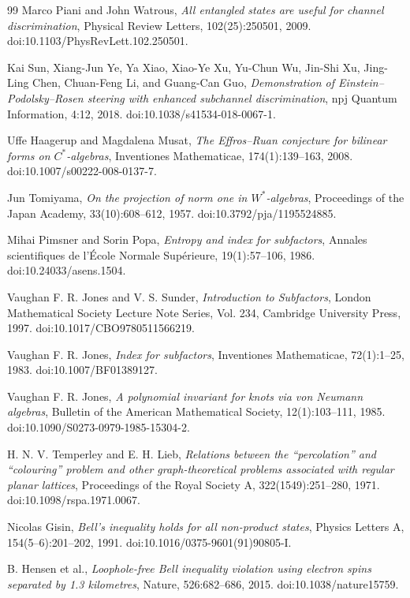 \documentclass{article}
\begin{document}
\begin{thebibliography}{99}
Marco Piani and John Watrous,
\textit{All entangled states are useful for channel discrimination},
Physical Review Letters, 102(25):250501, 2009.
doi:10.1103/PhysRevLett.102.250501.

Kai Sun, Xiang-Jun Ye, Ya Xiao, Xiao-Ye Xu, Yu-Chun Wu, Jin-Shi Xu,
Jing-Ling Chen, Chuan-Feng Li, and Guang-Can Guo,
\textit{Demonstration of Einstein--Podolsky--Rosen steering with enhanced
subchannel discrimination},
npj Quantum Information, 4:12, 2018.
doi:10.1038/s41534-018-0067-1.

Uffe Haagerup and Magdalena Musat,
\textit{The Effros--Ruan conjecture for bilinear forms on $C^*$-algebras},
Inventiones Mathematicae, 174(1):139--163, 2008.
doi:10.1007/s00222-008-0137-7.

Jun Tomiyama,
\textit{On the projection of norm one in $W^*$-algebras},
Proceedings of the Japan Academy, 33(10):608--612, 1957.
doi:10.3792/pja/1195524885.

Mihai Pimsner and Sorin Popa,
\textit{Entropy and index for subfactors},
Annales scientifiques de l'\'Ecole Normale Sup\'erieure,
19(1):57--106, 1986.
doi:10.24033/asens.1504.

Vaughan F. R. Jones and V. S. Sunder,
\textit{Introduction to Subfactors},
London Mathematical Society Lecture Note Series, Vol. 234,
Cambridge University Press, 1997.
doi:10.1017/CBO9780511566219.

Vaughan F. R. Jones,
\textit{Index for subfactors},
Inventiones Mathematicae, 72(1):1--25, 1983.
doi:10.1007/BF01389127.

Vaughan F. R. Jones,
\textit{A polynomial invariant for knots via von Neumann algebras},
Bulletin of the American Mathematical Society, 12(1):103--111, 1985.
doi:10.1090/S0273-0979-1985-15304-2.

H. N. V. Temperley and E. H. Lieb,
\textit{Relations between the ``percolation'' and ``colouring'' problem and other graph-theoretical problems associated with regular planar lattices},
Proceedings of the Royal Society A, 322(1549):251--280, 1971.
doi:10.1098/rspa.1971.0067.

Nicolas Gisin,
\textit{Bell's inequality holds for all non-product states},
Physics Letters A, 154(5--6):201--202, 1991.
doi:10.1016/0375-9601(91)90805-I.

B. Hensen et al.,
\textit{Loophole-free Bell inequality violation using electron spins
separated by 1.3 kilometres},
Nature, 526:682--686, 2015.
doi:10.1038/nature15759.


\end{thebibliography}
\end{document}
